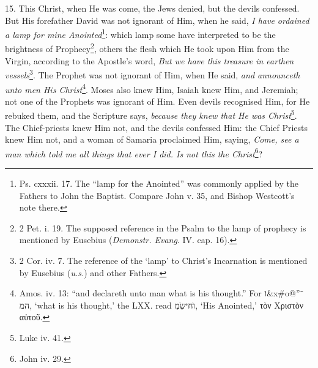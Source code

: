 15. This Christ, when He was come, the Jews denied, but the devils confessed. But His forefather David was not ignorant of Him, when he said, \emph{I have ordained a lamp for mine Anointed}\footnote{Ps. cxxxii. 17. The “lamp for the Anointed” was commonly applied by the Fathers to John the Baptist. Compare John v. 35, and Bishop Westcott’s note there.}: which lamp some have interpreted to be the brightness of Prophecy\footnote{2 Pet. i. 19. The supposed reference in the Psalm to the lamp of prophecy is mentioned by Eusebius (\emph{Demonstr. Evang}. IV. cap. 16).}, others the flesh which He took upon Him from the Virgin, according to the Apostle’s word, \emph{But we have this treasure in earthen vessels}\footnote{2 Cor. iv. 7. The reference of the ‘lamp’ to Christ’s Incarnation is mentioned by Eusebius (\emph{u.s.}) and other Fathers.}. The Prophet was not ignorant of Him, when He said, \emph{and announceth unto men His Christ}\footnote{Amos. iv. 13: “and declareth unto man what is his thought.” For \texthebrew{ו\&x\#o@”\texthebrew{־המ}}, ‘what is his thought,’ the \textsc{LXX.} read \texthebrew{ו\texthebrew{ׂחישִֹמְ}}, ‘His Anointed,’ \textgreek{τὸν Χριστὸν αὐτοῦ}.}. Moses also knew Him, Isaiah knew Him, and Jeremiah; not one of the Prophets was ignorant of Him. Even devils recognised Him, for He rebuked them, and the Scripture says, \emph{because they knew that He was Christ}\footnote{Luke iv. 41.}. The Chief-priests knew Him not, and the devils confessed Him: the Chief Priests knew Him not, and a woman of Samaria proclaimed Him, saying, \emph{Come, see a man which told me all things that ever I did. Is not this the Christ}\footnote{John iv. 29.}?

